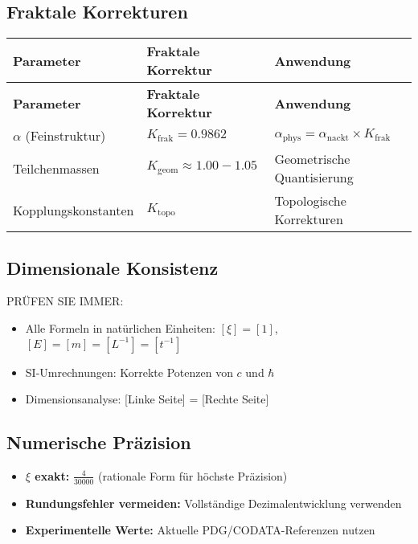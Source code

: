 \documentclass[12pt,a4paper]{article}
\begin{document}
	\subsection{Fraktale Korrekturen}
	
	\begin{longtable}{|p{4cm}|p{4cm}|p{5cm}|}
		\hline
		\textbf{Parameter} & \textbf{Fraktale Korrektur} & \textbf{Anwendung} \\
		\hline
		\endfirsthead
		\hline
		\textbf{Parameter} & \textbf{Fraktale Korrektur} & \textbf{Anwendung} \\
		\hline
		\endhead
		\(\alpha\) (Feinstruktur) & \(K_{\text{frak}} = 0.9862\) & \(\alpha_{\text{phys}} = \alpha_{\text{nackt}} \times K_{\text{frak}}\) \\
		\hline
		Teilchenmassen & \(K_{\text{geom}} \approx 1.00-1.05\) & Geometrische Quantisierung \\
		\hline
		Kopplungskonstanten & \(K_{\text{topo}}\) & Topologische Korrekturen \\
		\hline
	\end{longtable}
	
	\subsection{Dimensionale Konsistenz}
	
	PRÜFEN SIE IMMER:
	\begin{itemize}
		\item Alle Formeln in natürlichen Einheiten: \([\xi] = [1]\), \([E] = [m] = [L^{-1}] = [t^{-1}]\)
		\item SI-Umrechnungen: Korrekte Potenzen von \(c\) und \(\hbar\)
		\item Dimensionsanalyse: [Linke Seite] = [Rechte Seite]
	\end{itemize}
	
	\subsection{Numerische Präzision}
	
	\begin{itemize}
		\item \textbf{\(\xi\) exakt:} \(\frac{4}{30000}\) (rationale Form für höchste Präzision)
		\item \textbf{Rundungsfehler vermeiden:} Vollständige Dezimalentwicklung verwenden
		\item \textbf{Experimentelle Werte:} Aktuelle PDG/CODATA-Referenzen nutzen
	\end{itemize}
	
\end{document}
